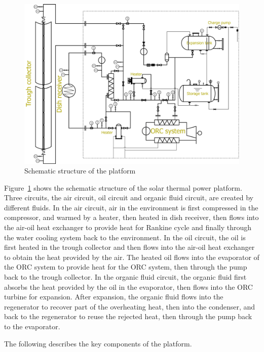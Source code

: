 \begin{figure}[!ht]
\centering
\includegraphics[width=1.0\textwidth]{fig/platform.jpg}
\caption{Schematic structure of the platform}\label{fig:platform}
\end{figure}
Figure~\ref{fig:platform} shows the schematic structure of the solar thermal power platform. 
Three circuits, the air circuit, oil circuit and organic fluid circuit, are created by different fluids. In the air circuit, air in the environment is first compressed in the compressor, and warmed by a heater, 
then heated in dish receiver, then flows into the air-oil heat exchanger to provide heat for Rankine cycle and finally through the water cooling system back to the environment. 
In the oil circuit, the oil is first heated in the trough collector and then flows into the air-oil heat exchanger to obtain the heat provided by the air. The heated oil flows 
into the evaporator of the ORC system to provide heat for the ORC system, then through the pump back to the trough collector.
In the organic fluid circuit, the organic fluid first absorbs the heat provided by the oil in the evaporator, then flows into the ORC turbine for expansion. After expansion, the organic fluid flows into the regenerator to recover part of the overheating heat, then into the condenser, and back to the regenerator to reuse the rejected heat, then through the pump back to the evaporator.

The following describes the key components of the platform.

